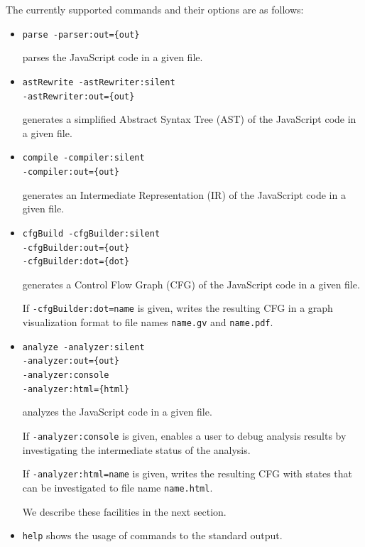 The currently supported commands and their options are as follows:
\begin{itemize}
\item \verb!parse -parser:out={out}!

parses the JavaScript code in a given file.
\item \verb!astRewrite -astRewriter:silent!\\
\hspace*{5.8em}\verb!-astRewriter:out={out}!

generates a simplified Abstract Syntax Tree (AST)
of the  JavaScript code in a given file.
\item \verb!compile -compiler:silent!\\
\hspace*{4.2em}\verb!-compiler:out={out}!

generates an Intermediate Representation (IR)
of the  JavaScript code in a given file.
\item \verb!cfgBuild -cfgBuilder:silent!\\
\hspace*{4.8em}\verb!-cfgBuilder:out={out}!\\
\hspace*{4.8em}\verb!-cfgBuilder:dot={dot}!

generates a Control Flow Graph (CFG) of the  JavaScript code in a given file.

If \verb!-cfgBuilder:dot=name! is given,
\safe writes the resulting CFG in a graph visualization format
to file names \verb!name.gv! and \verb!name.pdf!.

\item \verb!analyze -analyzer:silent!\\
\hspace*{4.4em}\verb!-analyzer:out={out}!\\
\hspace*{4.4em}\verb!-analyzer:console!\\
\hspace*{4.4em}\verb!-analyzer:html={html}!

analyzes the  JavaScript code in a given file.

If \verb!-analyzer:console! is given,
\safe enables a user to debug analysis results by investigating the intermediate
status of the analysis.

If \verb!-analyzer:html=name! is given,
\safe writes the resulting CFG with states that can be investigated to
file name \verb!name.html!.

We describe these facilities in the next section.

\item \verb!help! shows the usage of \safe commands to the standard output.
\end{itemize}

